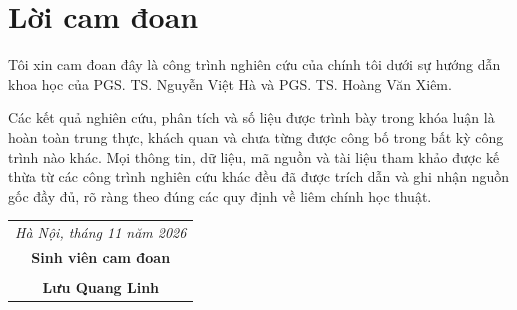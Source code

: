 \chapter*{Lời cam đoan}
\thispagestyle{empty}

Tôi xin cam đoan đây là công trình nghiên cứu của chính tôi dưới sự hướng dẫn khoa học của PGS. TS. Nguyễn Việt Hà và PGS. TS. Hoàng Văn Xiêm. 

Các kết quả nghiên cứu, phân tích và số liệu được trình bày trong khóa luận là hoàn toàn trung thực, khách quan và chưa từng được công bố trong bất kỳ công trình nào khác. Mọi thông tin, dữ liệu, mã nguồn và tài liệu tham khảo được kế thừa từ các công trình nghiên cứu khác đều đã được trích dẫn và ghi nhận nguồn gốc đầy đủ, rõ ràng theo đúng các quy định về liêm chính học thuật.

\vspace{1.5cm}
\begin{flushright}
\begin{tabular}{c}
\textit{Hà Nội, tháng 11 năm 2026} \\
\textbf{Sinh viên cam đoan} \\
\vspace{2cm} \\
\textbf{Lưu Quang Linh}
\end{tabular}
\end{flushright}
